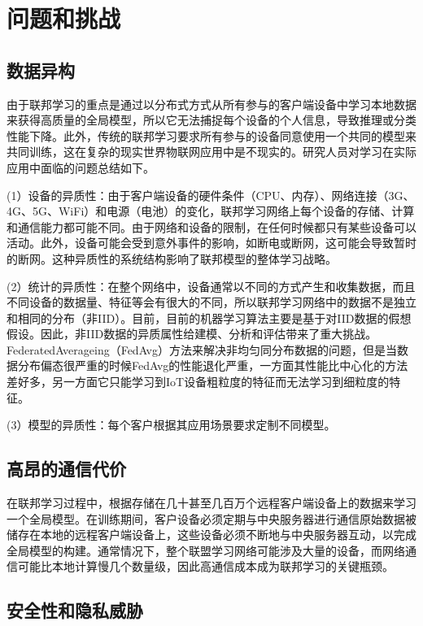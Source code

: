 \section {问题和挑战}


\subsection{数据异构}
由于联邦学习的重点是通过以分布式方式从所有参与的客户端设备中学习本地数据来获得高质量的全局模型，所以它无法捕捉每个设备的个人信息，导致推理或分类性能下降。此外，传统的联邦学习要求所有参与的设备同意使用一个共同的模型来共同训练，这在复杂的现实世界物联网应用中是不现实的。研究人员对学习在实际应用中面临的问题总结如下\cite{ref5}。

(1）设备的异质性：由于客户端设备的硬件条件（CPU、内存）、网络连接（3G、4G、5G、WiFi）和电源（电池）的变化，联邦学习网络上每个设备的存储、计算和通信能力都可能不同。由于网络和设备的限制，在任何时候都只有某些设备可以活动。此外，设备可能会受到意外事件的影响，如断电或断网，这可能会导致暂时的断网。这种异质性的系统结构影响了联邦模型的整体学习战略。

(2）统计的异质性：在整个网络中，设备通常以不同的方式产生和收集数据，而且不同设备的数据量、特征等会有很大的不同，所以联邦学习网络中的数据不是独立和相同的分布（非IID）。目前，目前的机器学习算法主要是基于对IID数据的假想假设。因此，非IID数据的异质属性给建模、分析和评估带来了重大挑战。FederatedAverageing（FedAvg）方法来解决非均匀同分布数据的问题，但是当数据分布偏态很严重的时候FedAvg的性能退化严重，一方面其性能比中心化的方法差好多，另一方面它只能学习到IoT设备粗粒度的特征而无法学习到细粒度的特征。

(3）模型的异质性：每个客户根据其应用场景要求定制不同模型。

\subsection{高昂的通信代价}
在联邦学习过程中，根据存储在几十甚至几百万个远程客户端设备上的数据来学习一个全局模型。在训练期间，客户设备必须定期与中央服务器进行通信原始数据被储存在本地的远程客户端设备上，这些设备必须不断地与中央服务器互动，以完成全局模型的构建。通常情况下，整个联盟学习网络可能涉及大量的设备，而网络通信可能比本地计算慢几个数量级，因此高通信成本成为联邦学习的关键瓶颈。

\subsection{安全性和隐私威胁}

